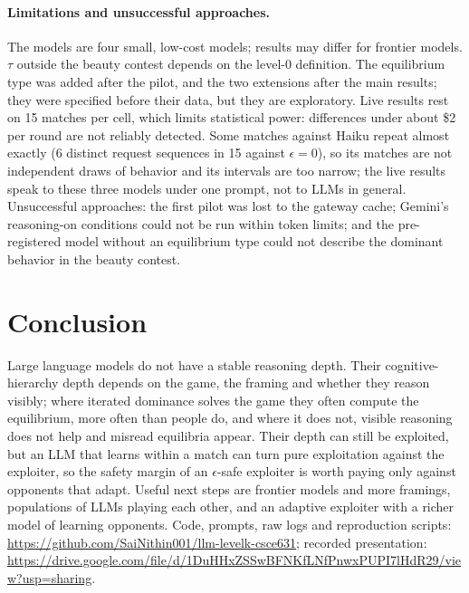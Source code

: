 \documentclass[11pt]{article}
\newcommand{\codelink}{\url{https://github.com/SaiNithin001/llm-levelk-csce631}}
\newcommand{\videolink}{\url{https://drive.google.com/file/d/1DuHHxZSSwBFNKfLNfPnwxPUPI7lHdR29/view?usp=sharing}}
\begin{document}
\paragraph{Limitations and unsuccessful approaches.} The models are four small, low-cost models; results may differ for frontier models. $\tau$ outside the beauty contest depends on the level-0 definition. The equilibrium type was added after the pilot, and the two extensions after the main results; they were specified before their data, but they are exploratory. Live results rest on 15 matches per cell, which limits statistical power: differences under about \$2 per round are not reliably detected. Some matches against Haiku repeat almost exactly (6 distinct request sequences in 15 against $\epsilon=0$), so its matches are not independent draws of behavior and its intervals are too narrow; the live results speak to these three models under one prompt, not to LLMs in general. Unsuccessful approaches: the first pilot was lost to the gateway cache; Gemini's reasoning-on conditions could not be run within token limits; and the pre-registered model without an equilibrium type could not describe the dominant behavior in the beauty contest.

\section{Conclusion}
Large language models do not have a stable reasoning depth. Their cognitive-hierarchy depth depends on the game, the framing and whether they reason visibly; where iterated dominance solves the game they often compute the equilibrium, more often than people do, and where it does not, visible reasoning does not help and misread equilibria appear. Their depth can still be exploited, but an LLM that learns within a match can turn pure exploitation against the exploiter, so the safety margin of an $\epsilon$-safe exploiter is worth paying only against opponents that adapt. Useful next steps are frontier models and more framings, populations of LLMs playing each other, and an adaptive exploiter with a richer model of learning opponents. Code, prompts, raw logs and reproduction scripts: \codelink; recorded presentation: \videolink.
\end{document}
